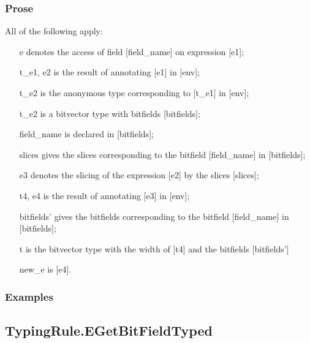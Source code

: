 \documentclass{book}
\begin{document}
  \subsubsection{Prose}
  All of the following apply:
  \begin{itemize}
  \item  [e] denotes the access of field [field\_name] on expression [e1];
  \item  [t\_e1, e2] is the result of annotating [e1] in [env];
  \item  [t\_e2] is the anonymous type corresponding to [t\_e1] in [env];
  \item  [t\_e2] is a bitvector type with bitfields [bitfields];
  \item  [field\_name] is declared in [bitfields];
  \item  [slices] gives the slices corresponding to the bitfield [field\_name] in
    [bitfields];
  \item  [e3] denotes the slicing of the expression [e2] by the slices [slices];
  \item  [t4, e4] is the result of annotating [e3] in [env];
  \item  [bitfields'] gives the bitfields corresponding to the bitfield [field\_name]
    in [bitfields];
  \item  [t] is the bitvector type with the width of [t4] and the bitfields [bitfields']
  \item  [new\_e] is [e4].
  \end{itemize}

  \subsubsection{Examples}

\subsection{TypingRule.EGetBitFieldTyped}
\end{document}
